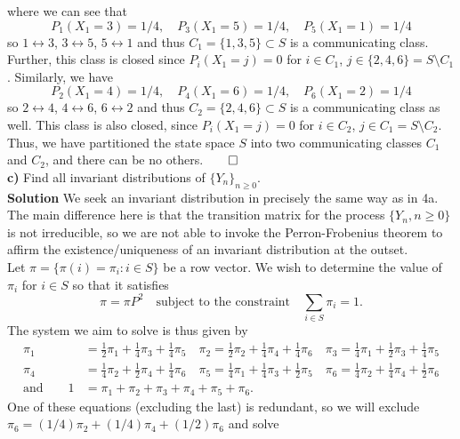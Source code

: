 \documentclass[11pt, letterpaper]{article}
\begin{document}
    where we can see that
    \[P_1(X_1=3)=1/4,\quad P_3(X_1=5)=1/4,\quad P_5(X_1=1)=1/4\]
    so $1\longleftrightarrow 3$, $3\longleftrightarrow 5$, $5\longleftrightarrow 1$ and thus $C_1=\{1,3,5\}\subset S$ is a communicating class. Further, this class is closed since
    $P_i(X_1=j)=0$ for $i\in C_1$, $j\in\{2, 4, 6\}=S\setminus C_1$. Similarly, we have
    \[P_2(X_1=4)=1/4,\quad P_4(X_1=6)=1/4,\quad P_6(X_1=2)=1/4\]
    so $2\longleftrightarrow 4$, $4\longleftrightarrow 6$, $6\longleftrightarrow 2$ and thus $C_2=\{2,4,6\}\subset S$ is a communicating class as well. This class is also closed, since
    $P_i(X_1=j)=0$ for $i\in C_2$, $j\in C_1=S\setminus C_2$. Thus, we have partitioned the state space $S$ into two communicating classes $C_1$ and $C_2$, and there can be no others.\hfill{$\qed$}\\[10pt]
    {\bf c)} Find all invariant distributions of $\{Y_n\}_{n\geq 0}$.\\[10pt]
    {\bf Solution} We seek an invariant distribution in precisely the same way as in 4a. The main difference here is that the transition matrix for the process $\{Y_n,n\geq 0\}$ is not irreducible, so we are
    not able to invoke the Perron-Frobenius theorem to affirm the existence/uniqueness of an invariant distribution at the outset.\\[10pt]
    Let $\pi=\{\pi(i)=\pi_i: i\in S\}$ be a row vector. We wish to determine the value of $\pi_i$ for $i\in S$ so that it satisfies
    \[\pi=\pi P^2\quad\text{subject to the constraint}\quad \sum_{i\in S}\pi_i=1.\]
    The system we aim to solve is thus given by
    \begin{align*}
        \pi_1&=\frac{1}{2}\pi_1+\frac{1}{4}\pi_3+\frac{1}{4}\pi_5\quad
        \pi_2=\frac{1}{2}\pi_2+\frac{1}{4}\pi_4+\frac{1}{4}\pi_6\quad
        \pi_3=\frac{1}{4}\pi_1+\frac{1}{2}\pi_3+\frac{1}{4}\pi_5\\
        \pi_4&=\frac{1}{4}\pi_2+\frac{1}{2}\pi_4+\frac{1}{4}\pi_6\quad
        \pi_5=\frac{1}{4}\pi_1+\frac{1}{4}\pi_3+\frac{1}{2}\pi_5\quad
        \pi_6=\frac{1}{4}\pi_2+\frac{1}{4}\pi_4+\frac{1}{2}\pi_6\\
        \text{and}\qquad 1&=\pi_1+\pi_2+\pi_3+\pi_4+\pi_5+\pi_6.
    \end{align*}
    One of these equations (excluding the last) is redundant, so we will exclude $\pi_6=(1/4)\pi_2+(1/4)\pi_4+(1/2)\pi_6$ and solve
\end{document}
